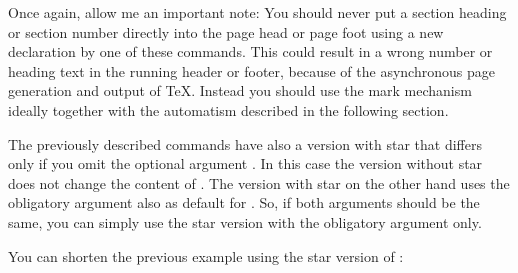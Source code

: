 Once again, allow me an important note: You should never
put a section heading or section number directly into the page head or
page foot using a new declaration by one of these commands. This could result in
a wrong number or heading text in the running header or footer, because of the
asynchronous page generation and output of \TeX. Instead you should use the
mark mechanism ideally together with the automatism described in the following
section.%
\EndIndexGroup


\begin{Declaration}
\end{Declaration}
The previously described commands have also a version with
star that differs only if you
omit the optional argument . In this case
the version without star does not change the content of
. The version with star on the other hand uses
the obligatory argument  also as default for
. So, if both arguments should be the same, you
can simply use the star version with the obligatory argument only.%

\begin{Example}
  You can shorten the previous example using the star version of
  :
\end{Example}

